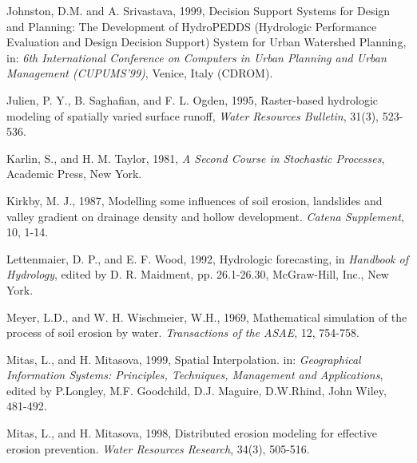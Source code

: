 \documentclass{kapedbk} %
\begin{document}
\begin{chapthebibliography}{1}
{\bibitem{}
Johnston, D.M. and A. Srivastava, 1999, Decision Support Systems for Design 
and Planning: The Development of HydroPEDDS (Hydrologic Performance 
Evaluation and Design Decision Support) System for Urban Watershed Planning, 
in: {\sl 6th International Conference on Computers in Urban Planning 
and Urban Management (CUPUMS'99)}, Venice, Italy (CDROM).


\bibitem{}
Julien, P. Y., B. Saghafian, and F. L. Ogden, 1995, Raster-based hydrologic modeling of spatially
varied surface runoff, {\it Water Resources Bulletin}, 31(3), 523-536.


\bibitem{} Karlin, S., and H. M.  Taylor, 1981, {\it A Second Course in Stochastic Processes},
Academic Press, New York.

\bibitem{}
Kirkby, M. J., 1987, Modelling some influences of soil erosion, landslides and valley gradient
on drainage density and hollow development. {\sl Catena Supplement}, 10, 1-14.


\bibitem{}
Lettenmaier, D. P., and E. F. Wood, 1992, Hydrologic forecasting, 
in {\it Handbook of Hydrology}, edited by D. R. Maidment, pp. 26.1-26.30, 
McGraw-Hill, Inc., New York.

\bibitem{}
Meyer, L.D., and W. H. Wischmeier, W.H., 1969, Mathematical simulation
of the process of soil erosion by water. {\it Transactions of the ASAE},
12, 754-758.


\bibitem{}
     Mitas, L., and H. Mitasova, 1999, Spatial Interpolation. in:
     {\sl Geographical Information Systems: Principles, Techniques,
     Management and Applications}, edited by P.Longley, M.F. Goodchild, 
     D.J. Maguire, D.W.Rhind, John Wiley, 481-492.

\bibitem{}
     Mitas, L., and H. Mitasova, 1998, Distributed erosion modeling for
     effective erosion prevention. {\it Water Resources Research}, 34(3),
     505-516.

}
\end{chapthebibliography}
\end{document}
